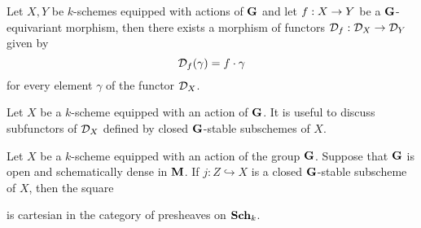 \begin{remark}\label{remark:functoriality_of_bb_functor}
Let $X,Y$ be $k$-schemes equipped with actions of $\mathbf{G}$ and let $f:X\rightarrow Y$ be a $\mathbf{G}$-equivariant morphism, then there exists a morphism of functors ${\mathcal D}_f:{\mathcal D}_X\rightarrow {\mathcal D}_Y$ given by
$${\mathcal D}_f(\gamma) = f\cdot \gamma$$
for every element $\gamma$ of the functor ${\mathcal D}_X$.
\end{remark}
\noindent
Let $X$ be a $k$-scheme equipped with an action of $\mathbf{G}$. It is useful to discuss subfunctors of ${\mathcal D}_X$ defined by closed $\mathbf{G}$-stable subschemes of $X$.

\begin{theorem}\label{theorem:closed_subfunctors_induced_by_closed_stable_subschemes}
Let $X$ be a $k$-scheme equipped with an action of the group $\mathbf{G}$. Suppose that $\mathbf{G}$ is open and schematically dense in $\mathbf{M}$. If $j:Z\hookrightarrow X$ is a closed $\mathbf{G}$-stable subscheme of $X$, then the square
\begin{center}
\end{center}
is cartesian in the category of presheaves on $\mathbf{Sch}_k$.
\end{theorem}
